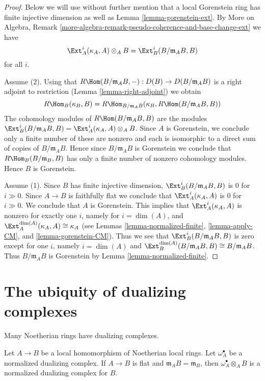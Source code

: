 \begin{proof}
Below we will use without further mention that a local Gorenstein ring
has finite injective dimension as well as Lemma \ref{lemma-gorenstein-ext}.
By More on Algebra, Remark
\ref{more-algebra-remark-pseudo-coherence-and-base-change-ext}
we have
$$
\Ext^i_A(\kappa_A, A) \otimes_A B =
\Ext^i_B(B/\mathfrak m_A B, B)
$$
for all $i$.

\medskip\noindent
Assume (2). Using that
$R\Hom(B/\mathfrak m_A B, -) : D(B) \to D(B/\mathfrak m_A B)$ is a
right adjoint to restriction (Lemma \ref{lemma-right-adjoint}) we obtain
$$
R\Hom_B(\kappa_B, B) =
R\Hom_{B/\mathfrak m_A B}(\kappa_B, R\Hom(B/\mathfrak m_A B, B))
$$
The cohomology modules of $R\Hom(B/\mathfrak m_A B, B)$ are the modules
$\Ext^i_B(B/\mathfrak m_A B, B) =
\Ext^i_A(\kappa_A, A) \otimes_A B$.
Since $A$ is Gorenstein, we conclude only a finite number of these are nonzero
and each is isomorphic to a direct sum of copies of $B/\mathfrak m_A B$.
Hence since $B/\mathfrak m_A B$ is Gorenstein we conclude that
$R\Hom_B(B/\mathfrak m_B, B)$ has only a finite number of nonzero
cohomology modules. Hence $B$ is Gorenstein.

\medskip\noindent
Assume (1). Since $B$ has finite injective dimension,
$\Ext^i_B(B/\mathfrak m_A B, B)$ is $0$ for $i \gg 0$.
Since $A \to B$ is faithfully flat
we conclude that $\Ext^i_A(\kappa_A, A)$ is $0$
for $i \gg 0$. We conclude that $A$ is Gorenstein. This implies that
$\Ext^i_A(\kappa_A, A)$ is nonzero for exactly one $i$,
namely for $i = \dim(A)$, and
$\Ext^{\dim(A)}_A(\kappa_A, A) \cong \kappa_A$
(see Lemmas \ref{lemma-normalized-finite}, \ref{lemma-apply-CM}, and
\ref{lemma-gorenstein-CM}).
Thus we see that
$\Ext^i_B(B/\mathfrak m_A B, B)$ is zero except for one $i$,
namely $i = \dim(A)$ and
$\Ext^{\dim(A)}_B(B/\mathfrak m_A B, B) \cong B/\mathfrak m_A B$.
Thus $B/\mathfrak m_A B$ is Gorenstein by
Lemma \ref{lemma-normalized-finite}.
\end{proof}





\section{The ubiquity of dualizing complexes}
\label{section-ubiquity-dualizing}

\noindent
Many Noetherian rings have dualizing complexes.

\begin{lemma}
\label{lemma-flat-unramified}
Let $A \to B$ be a local homomorphism of Noetherian local rings.
Let $\omega_A^\bullet$ be a normalized dualizing complex.
If $A \to B$ is flat and $\mathfrak m_A B = \mathfrak m_B$,
then $\omega_A^\bullet \otimes_A B$ is a normalized dualizing
complex for $B$.
\end{lemma}


